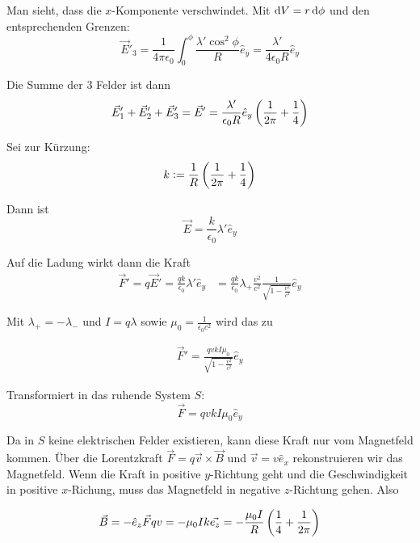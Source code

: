 \documentclass[a4paper,german,12pt,smallheadings]{scrartcl}
\begin{document}
Man sieht, dass die $x$-Komponente verschwindet. Mit $\dif V = r \dif \phi$ und
den entsprechenden Grenzen:
\begin{equation}
  \vec{E}'_3 = \frac{1}{4 \pi \epsilon_0} \int_0^\phi \frac{\lambda' \cos^2 \phi}{R} \hat{e}_y
  = \frac{\lambda'}{4 \epsilon_0 R} \hat{e}_y
\end{equation}

Die Summe der 3 Felder ist dann
\begin{align*}
  \vec{E}'_1 + \vec{E}'_2 + \vec{E}'_3 = \vec{E}' = \frac{\lambda'}{\epsilon_0 R} \hat{e}_y \del{\frac{1}{2 \pi} + \frac{1}{4}}
\end{align*}

Sei zur Kürzung:
\begin{equation}
  k := \frac{1}{R} \del{\frac{1}{2 \pi} + \frac{1}{4}}
\end{equation}

Dann ist
\begin{equation}
  \vec{E} = \frac{k}{\epsilon_0} \lambda' \hat{e}_y
\end{equation}

Auf die Ladung wirkt dann die Kraft
\begin{align*}
  \vec{F}' = q \vec{E}' = \frac{qk}{\epsilon_0} \lambda' \hat{e}_y
  &= \frac{qk}{\epsilon_0} \lambda_{+} \frac{v^2}{c^2} \frac{1}{\sqrt{1-\frac{v^2}{c^2}}} \hat{e}_y
\end{align*}

Mit $\lambda_+ = -\lambda_-$ und $I = q \lambda$ sowie $\mu_0 =
\frac{1}{\epsilon_0 c^2}$ wird das zu

\begin{align*}
  \vec{F}' = \frac{qv kI \mu_0}{\sqrt{1 - \frac{v^2}{c^2}}} \hat{e}_y
\end{align*}

Transformiert in das ruhende System $S$:
\begin{equation}
  \vec{F} = qvkI \mu_0 \hat{e}_y
\end{equation}

Da in $S$ keine elektrischen Felder existieren, kann diese Kraft nur vom
Magnetfeld kommen. Über die Lorentzkraft $\vec{F} = q\vec{v} \times \vec{B}$
und $\vec{v} = v \hat{e}_x$ rekonstruieren wir das Magnetfeld. Wenn die Kraft
in positive $y$-Richtung geht und die Geschwindigkeit in positive $x$-Richung,
muss das Magnetfeld in negative $z$-Richtung gehen. Also

\begin{equation}
  \vec{B} = -\hat{e}_z \vec{F}{qv} = - \mu_0 I k \vec{e_z} = - \frac{\mu_0 I}{R} \del{\frac{1}{4} + \frac{1}{2\pi}}
\end{equation}
\end{document}
